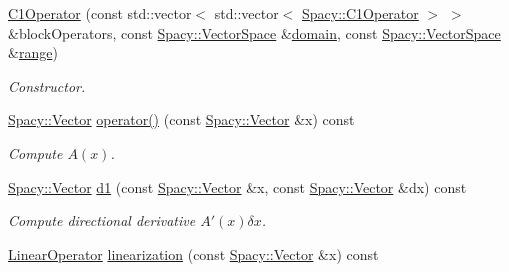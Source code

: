 \begin{DoxyCompactItemize}
\item 
\hyperlink{classSpacy_1_1ProductSpace_1_1C1Operator_aa2f8289154017a4dd4fe879ba6409d33}{C1\-Operator} (const std\-::vector$<$ std\-::vector$<$ \hyperlink{classSpacy_1_1C1Operator}{Spacy\-::\-C1\-Operator} $>$ $>$ \&block\-Operators, const \hyperlink{classSpacy_1_1VectorSpace}{Spacy\-::\-Vector\-Space} \&\hyperlink{classSpacy_1_1OperatorBase_a2588f9b3e0188820c4c494e63293dc6f}{domain}, const \hyperlink{classSpacy_1_1VectorSpace}{Spacy\-::\-Vector\-Space} \&\hyperlink{classSpacy_1_1OperatorBase_ab19d3b7a6f290b1079248f1e567e53d6}{range})
\begin{DoxyCompactList}\small\item\em Constructor. \end{DoxyCompactList}\item 
\hypertarget{classSpacy_1_1ProductSpace_1_1C1Operator_acc43622efd331f8de501a56b264484c3}{\hyperlink{classSpacy_1_1Vector}{Spacy\-::\-Vector} \hyperlink{classSpacy_1_1ProductSpace_1_1C1Operator_acc43622efd331f8de501a56b264484c3}{operator()} (const \hyperlink{classSpacy_1_1Vector}{Spacy\-::\-Vector} \&x) const }\label{classSpacy_1_1ProductSpace_1_1C1Operator_acc43622efd331f8de501a56b264484c3}

\begin{DoxyCompactList}\small\item\em Compute $A(x)$. \end{DoxyCompactList}\item 
\hypertarget{classSpacy_1_1ProductSpace_1_1C1Operator_a60d47206ccf4c30259b72f30802a27f3}{\hyperlink{classSpacy_1_1Vector}{Spacy\-::\-Vector} \hyperlink{classSpacy_1_1ProductSpace_1_1C1Operator_a60d47206ccf4c30259b72f30802a27f3}{d1} (const \hyperlink{classSpacy_1_1Vector}{Spacy\-::\-Vector} \&x, const \hyperlink{classSpacy_1_1Vector}{Spacy\-::\-Vector} \&dx) const }\label{classSpacy_1_1ProductSpace_1_1C1Operator_a60d47206ccf4c30259b72f30802a27f3}

\begin{DoxyCompactList}\small\item\em Compute directional derivative $A'(x)\delta x$. \end{DoxyCompactList}\item 
\hypertarget{classSpacy_1_1ProductSpace_1_1C1Operator_a084a61ae7c818c3b4448e4dce68c3342}{\hyperlink{classSpacy_1_1LinearOperator}{Linear\-Operator} \hyperlink{classSpacy_1_1ProductSpace_1_1C1Operator_a084a61ae7c818c3b4448e4dce68c3342}{linearization} (const \hyperlink{classSpacy_1_1Vector}{Spacy\-::\-Vector} \&x) const }\label{classSpacy_1_1ProductSpace_1_1C1Operator_a084a61ae7c818c3b4448e4dce68c3342}


\end{DoxyCompactItemize}
